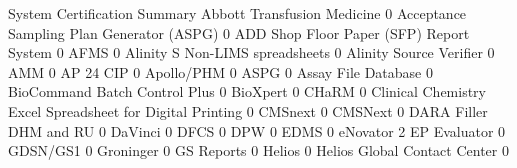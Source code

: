 \documentclass{article}
\begin{document}
\begin{Schunk}
\begin{Soutput}
                                                            System Certification Summary
  Abbott Transfusion Medicine                                                          0
  Acceptance Sampling Plan Generator (ASPG)                                            0
  ADD Shop Floor Paper (SFP) Report System                                             0
  AFMS                                                                                 0
  Alinity S Non-LIMS spreadsheets                                                      0
  Alinity Source Verifier                                                              0
  AMM                                                                                  0
  AP 24 CIP                                                                            0
  Apollo/PHM                                                                           0
  ASPG                                                                                 0
  Assay File Database                                                                  0
  BioCommand Batch Control Plus                                                        0
  BioXpert                                                                             0
  CHaRM                                                                                0
  Clinical Chemistry Excel Spreadsheet for Digital Printing                            0
  CMSnext                                                                              0
  CMSNext                                                                              0
  DARA Filler DHM and RU                                                               0
  DaVinci                                                                              0
  DFCS                                                                                 0
  DPW                                                                                  0
  EDMS                                                                                 0
  eNovator                                                                             2
  EP Evaluator                                                                         0
  GDSN/GS1                                                                             0
  Groninger                                                                            0
  GS Reports                                                                           0
  Helios                                                                               0
  Helios Global Contact Center                                                         0

\end{Soutput}
\end{Schunk}
\end{document}
